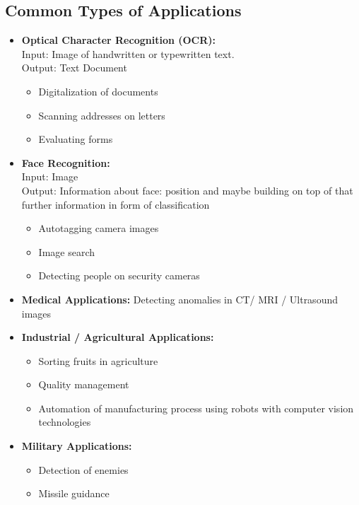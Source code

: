 \subsection{Common Types of Applications}

\begin{itemize}
    \item \textbf{Optical Character Recognition (OCR):}
          \\Input: Image of handwritten or typewritten text.\\
          Output: Text Document
          \begin{itemize}
              \item Digitalization of documents
              \item Scanning addresses on letters
              \item Evaluating forms
          \end{itemize}
    \item \textbf{Face Recognition:}\\
          Input: Image\\
          Output: Information about face: position and maybe building on top of that further information in form of classification
          \begin{itemize}
              \item Autotagging camera images
              \item Image search
              \item Detecting people on security cameras
          \end{itemize}
    \item \textbf{Medical Applications:} Detecting anomalies in CT/ MRI / Ultrasound images
    \item \textbf{Industrial / Agricultural Applications:}
          \begin{itemize}
              \item Sorting fruits in agriculture
              \item Quality management
              \item Automation of manufacturing process using robots with computer vision technologies
          \end{itemize}
    \item \textbf{Military Applications:}
          \begin{itemize}
              \item Detection of enemies
              \item Missile guidance

\end{itemize}
\end{itemize}

